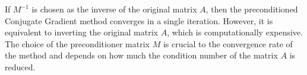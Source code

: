 If $M^{-1}$ is chosen as the inverse of the original matrix $A$, then the preconditioned Conjugate Gradient method converges in a single iteration. However, it is equivalent to inverting the original matrix $A$, which is computationally expensive. The choice of the preconditioner matrix $M$ is crucial to the convergence rate of the method and depends on how much the condition number of the matrix $A$ is reduced.  